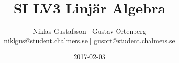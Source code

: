 \documentclass{article}
\title{SI LV3 Linjär Algebra}
\author{Niklas Gustafsson | Gustav Örtenberg  \\ \small{niklgus@student.chalmers.se} | \small{gusort@student.chalmers.se}}
\date{2017-02-03}
\begin{document}
\maketitle
\section{}


\section{}


\section{}


\section{}


\section{}


\section{}

\end{document}
